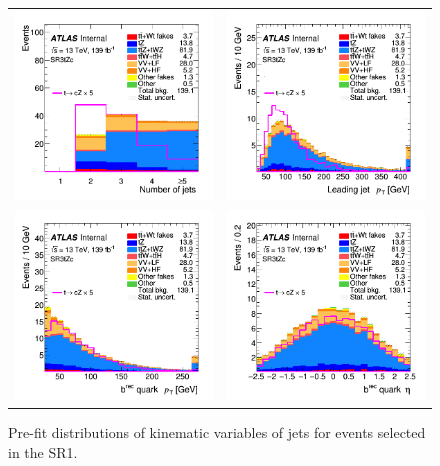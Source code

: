 \begin{figure}[]
	\centering
	\begin{tabular}{cc}
		\includegraphics[width=.35\textwidth]{Appendices/AP5/figures/SR3_UsingDL1rc/nJets} &
		\includegraphics[width=.35\textwidth]{Appendices/AP5/figures/SR3_UsingDL1rc/jet_pt} \\
		\includegraphics[width=.35\textwidth]{Appendices/AP5/figures/SR3_UsingDL1rc/b_pt} & 
		\includegraphics[width=.35\textwidth]{Appendices/AP5/figures/SR3_UsingDL1rc/b_eta} \\
	\end{tabular}
	\caption{Pre-fit distributions of kinematic variables of jets for events selected in the SR1\tZc.
		\ErrStatOnly
		\Blinded
	}%
	\label{fig:sel:sr1:jets}
\end{figure}

